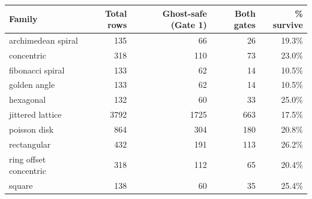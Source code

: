 \begin{tabular}{lrrrr}
\toprule Family & Total rows & Ghost-safe (Gate 1) & Both gates & \% survive \\ \midrule
archimedean spiral & 135 & 66 & 26 & 19.3\% \\
concentric & 318 & 110 & 73 & 23.0\% \\
fibonacci spiral & 133 & 62 & 14 & 10.5\% \\
golden angle & 133 & 62 & 14 & 10.5\% \\
hexagonal & 132 & 60 & 33 & 25.0\% \\
jittered lattice & 3792 & 1725 & 663 & 17.5\% \\
poisson disk & 864 & 304 & 180 & 20.8\% \\
rectangular & 432 & 191 & 113 & 26.2\% \\
ring offset concentric & 318 & 112 & 65 & 20.4\% \\
square & 138 & 60 & 35 & 25.4\% \\
\bottomrule \end{tabular}
